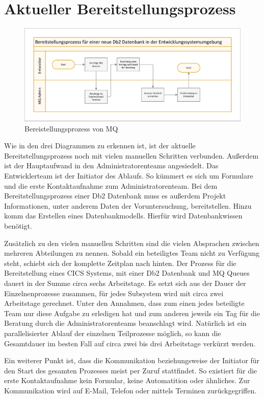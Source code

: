 \section{Aktueller Bereitstellungsprozess}
 \begin{figure}[h]
\centering
\includegraphics[width=\textwidth]{figures/swimlaneMQ.pdf}
\caption{Bereistellungsprozess von MQ}
\label{fig:aktmq}
\end{figure}
Wie in den drei Diagrammen zu erkennen ist, ist der aktuelle Bereitstellungsprozess noch mit vielen manuellen Schritten verbunden.
Außerdem ist der Hauptaufwand in den Administratorenteams angesiedelt.
Das Entwicklerteam ist der Initiator des Ablaufs.
So kümmert es sich um Formulare und die erste Kontaktaufnahme zum Administratorenteam.
Bei dem Bereitstellungsprozess einer Db2 Datenbank muss es außerdem Projekt Informationen, unter anderem Daten der Voruntersuchung, bereitstellen.
Hinzu komm das Erstellen eines Datenbankmodells.
Hierfür wird Datenbankwissen benötigt.

Zusätzlich zu den vielen manuellen Schritten sind die vielen Absprachen zwischen mehreren Abteilungen zu nennen.
Sobald ein beteiligtes Team nicht zu Verfügung steht, schiebt sich der komplette Zeitplan nach hinten.
Der Prozess für die Bereitstellung eines CICS Systems, mit einer Db2 Datenbank und MQ Queues dauert in der Summe circa sechs Arbeitstage.
Es setzt sich aus der Dauer der Einzelnenprozesse zusammen, für jedes Subsystem wird mit circa zwei Arbeitstage gerechnet.
Unter den Annahmen, dass zum einen jedes beteiligte Team nur diese Aufgabe zu erledigen hat und zum anderen jeweils ein Tag für die Beratung durch die Administratorenteams beanschlagt wird.
Natürlich ist ein parallelisierter Ablauf der einzelnen Teilprozesse möglich, so kann die Gesamtdauer im besten Fall auf circa zwei bis drei Arbeitstage verkürzt werden.

Ein weiterer Punkt ist, dass die Kommunikation beziehungsweise der Initiator für den Start des gesamten Prozesses meist per Zuruf stattfindet.
So existiert für die erste Kontaktaufnahme kein Formular, keine Automatition oder ähnliches.
Zur Kommunikation wird auf E-Mail, Telefon oder mittels Terminen zurückgegriffen.


 